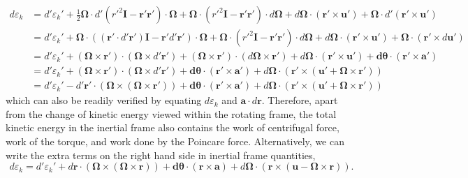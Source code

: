 \begin{equation}
\begin{aligned}
    d\varepsilon_k &= d'\varepsilon_k' + \frac{1}{2} \boldsymbol{\Omega} \cdot d'\left(r'^2 \mathbf{I} - \mathbf{r}'\mathbf{r}'\right) \cdot \boldsymbol{\Omega} + \boldsymbol{\Omega} \cdot \left(r'^2 \mathbf{I} - \mathbf{r}'\mathbf{r}'\right) \cdot d\boldsymbol{\Omega} + d \boldsymbol{\Omega} \cdot (\mathbf{r}'\times \mathbf{u'}) + \boldsymbol{\Omega}\cdot d'(\mathbf{r}'\times \mathbf{u'}) \\ 
    &= d'\varepsilon_k' + \boldsymbol{\Omega} \cdot \left((\mathbf{r}'\cdot d'\mathbf{r}') \mathbf{I} - \mathbf{r}'d'\mathbf{r}'\right) \cdot \boldsymbol{\Omega} + \boldsymbol{\Omega} \cdot \left(r'^2 \mathbf{I} - \mathbf{r}'\mathbf{r}'\right) \cdot d\boldsymbol{\Omega} + d \boldsymbol{\Omega} \cdot (\mathbf{r}'\times \mathbf{u'}) + \boldsymbol{\Omega}\cdot (\mathbf{r}'\times d\mathbf{u'}) \\ 
    &= d'\varepsilon_k' + (\boldsymbol{\Omega}\times \mathbf{r}')\cdot (\boldsymbol{\Omega}\times d'\mathbf{r}') + (\boldsymbol{\Omega} \times \mathbf{r}') \cdot (d\boldsymbol{\Omega} \times \mathbf{r}') + d \boldsymbol{\Omega} \cdot (\mathbf{r}'\times \mathbf{u'}) + \mathbf{d}\boldsymbol{\theta}\cdot (\mathbf{r}'\times \mathbf{a'}) \\ 
    &= d'\varepsilon_k' + (\boldsymbol{\Omega}\times \mathbf{r}')\cdot (\boldsymbol{\Omega}\times d'\mathbf{r}') + \mathbf{d}\boldsymbol{\theta}\cdot (\mathbf{r}'\times \mathbf{a'}) + d\boldsymbol{\Omega} \cdot \left(\mathbf{r}'\times (\mathbf{u}' + \boldsymbol{\Omega}\times \mathbf{r}')\right) \\ 
    &= d'\varepsilon_k' - d'\mathbf{r}' \cdot (\boldsymbol{\Omega}\times (\boldsymbol{\Omega}\times \mathbf{r}')) + \mathbf{d}\boldsymbol{\theta}\cdot (\mathbf{r}'\times \mathbf{a'}) + d\boldsymbol{\Omega} \cdot \left(\mathbf{r}'\times (\mathbf{u}' + \boldsymbol{\Omega}\times \mathbf{r}')\right)
\end{aligned}
\end{equation}
%
which can also be readily verified by equating $d\varepsilon_k$ and $\mathbf{a}\cdot d\mathbf{r}$. 
Therefore, apart from the change of kinetic energy viewed within the rotating frame, the total kinetic energy in the inertial frame also contains the work of centrifugal force, work of the torque, and work done by the Poincare force.
Alternatively, we can write the extra terms on the right hand side in inertial frame quantities, 
%
\begin{equation}
    d\varepsilon_k = d'\varepsilon_k' + d\mathbf{r} \cdot (\boldsymbol{\Omega}\times (\boldsymbol{\Omega}\times \mathbf{r})) + \mathbf{d}\boldsymbol{\theta}\cdot (\mathbf{r}\times \mathbf{a}) + d\boldsymbol{\Omega} \cdot \left(\mathbf{r}\times (\mathbf{u} - \boldsymbol{\Omega}\times \mathbf{r})\right).
\end{equation}
